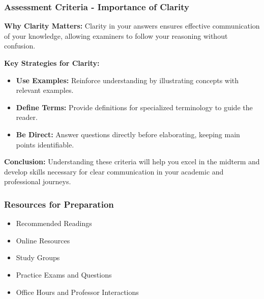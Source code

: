 \documentclass[aspectratio=169]{beamer}
\begin{document}
\begin{frame}[fragile]
    \frametitle{Assessment Criteria - Importance of Clarity}
    \textbf{Why Clarity Matters:} 
    Clarity in your answers ensures effective communication of your knowledge, allowing examiners to follow your reasoning without confusion.

    \textbf{Key Strategies for Clarity:}
    \begin{itemize}
        \item \textbf{Use Examples:} Reinforce understanding by illustrating concepts with relevant examples.
        \item \textbf{Define Terms:} Provide definitions for specialized terminology to guide the reader.
        \item \textbf{Be Direct:} Answer questions directly before elaborating, keeping main points identifiable.
    \end{itemize}

    \textbf{Conclusion:} 
    Understanding these criteria will help you excel in the midterm and develop skills necessary for clear communication in your academic and professional journeys.
\end{frame}

\begin{frame}[fragile]
    \frametitle{Resources for Preparation}
    \begin{itemize}
        \item Recommended Readings
        \item Online Resources
        \item Study Groups
        \item Practice Exams and Questions
        \item Office Hours and Professor Interactions
    \end{itemize}
\end{frame}
\end{document}
